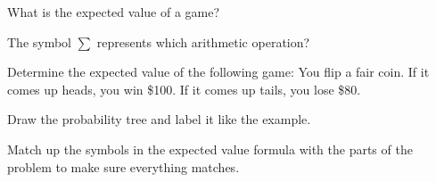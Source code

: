 \documentclass{ximera}
\begin{document}

\begin{question}
What is the expected value of a game?
  \begin{solution}
    \begin{multiple-choice}
    \end{multiple-choice}
  \end{solution}
\end{question}

\begin{question}
The symbol $\sum$ represents which arithmetic operation?
  \begin{solution}
    \begin{multiple-choice}
    \end{multiple-choice}
  \end{solution}
\end{question}

\begin{question}
Determine the expected value of the following game: You flip a fair coin. If it comes up heads, you win \$100. If it comes up tails, you lose \$80.
\begin{solution}
    \begin{multiple-choice}
    \end{multiple-choice}
    \begin{hint}
      Draw the probability tree and label it like the example.
    \end{hint}
    \begin{hint}
      Match up the symbols in the expected value formula with the parts of the problem to make sure everything matches.
    \end{hint}
  \end{solution}
\end{question}
\end{document}
